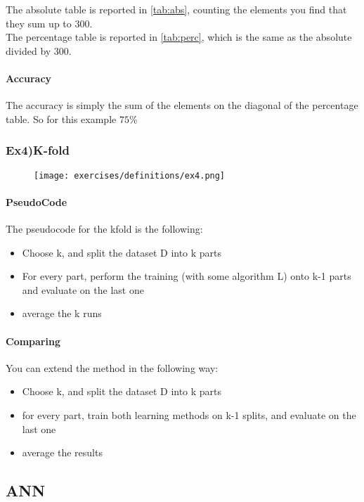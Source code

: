 The absolute table is reported in \ref{tab:abs}, counting the elements you find that they sum up to 300.\\
The percentage table is reported in \ref{tab:perc}, which is the same as the absolute divided by 300.
\paragraph{Accuracy}
The accuracy is simply the sum of the elements on the diagonal of the percentage table. So for this example $75\%$


\subsubsection{Ex4)K-fold }


\begin{figure}[H]
    \centering
    \texttt{[image: exercises/definitions/ex4.png]}
\end{figure}


\paragraph{PseudoCode}
The pseudocode for the kfold is the following:
\begin{itemize}
\item Choose k, and split the dataset D into k parts
\item For every part, perform the training (with some algorithm L) onto k-1 parts and evaluate on the last one 
\item average the k runs 
\end{itemize}

\paragraph{Comparing}
You can extend the method in the following way:
\begin{itemize}
\item Choose k, and split the dataset D into k parts
\item for every part, train both learning methods on k-1 splits, and evaluate on the last one
\item average the results
\end{itemize}

\subsection{ANN}

